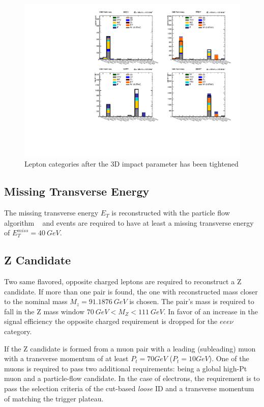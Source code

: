 \begin{figure}[tph]
  \centering
  \includegraphics[width=\textwidth]{fig/Run2/Rebining_HFakeString_SR1_A_RuRun2_M600.pdf}
  \caption{Lepton categories after the 3D impact parameter has been tightened}
  \label{fig:HFakeString_AfterIp3DCut}
\end{figure}






\subsection{Missing Transverse Energy}

The missing transverse energy $E_T$ is reconstructed with the particle flow
algorithm ~\cite{particleflow} and events are required to have at least a
missing transverse energy of $E_T^{miss}=40~GeV$.

\subsection{Z Candidate}

Two same flavored, opposite charged leptons are required to reconstruct a Z
candidate. If more than one pair is found, the one with reconstructed mass
closer to the nominal mass $M_z=91.1876~GeV$ is chosen. The pair's mass
is required to fall in the Z mass window $70~GeV < M_Z < 111~GeV$. In favor of an
increase in the signal efficiency the opposite charged requirement is dropped
for the $eee\nu$ category.

If the Z candidate is formed from a muon pair with a leading (subleading) muon with
a transverse momentum of at least $P_t=70 GeV$ ($P_t=10GeV$). One of the
muons is required to pass two additional requirements: being a global high-Pt muon and a
particle-flow candidate. In the case of electrons, the requirement is to pass the
selection criteria of the cut-based \emph{loose} ID and a transverse momentum of
matching the trigger plateau.

